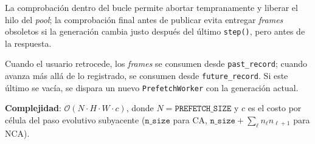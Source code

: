 La comprobación dentro del bucle permite abortar tempranamente y liberar el hilo del \textit{pool}; la comprobación final antes de publicar evita entregar \textit{frames} obsoletos si la generación cambia justo después del último \texttt{step()}, pero antes de la respuesta.

Cuando el usuario retrocede, los \textit{frames} se consumen desde \texttt{past\_record}; cuando avanza más allá de lo registrado, se consumen desde \texttt{future\_record}. Si este último se vacía, se dispara un nuevo \texttt{PrefetchWorker} con la generación actual.

\textbf{Complejidad}: $\mathcal{O}(N\cdot H\cdot W\cdot c)$, donde $N=\texttt{PREFETCH\_SIZE}$ y $c$ es el costo por célula del paso evolutivo subyacente ($\texttt{n\_size}$ para CA, $\texttt{n\_size}+\sum_\ell n_\ell  n_{\ell+1}$ para NCA).
